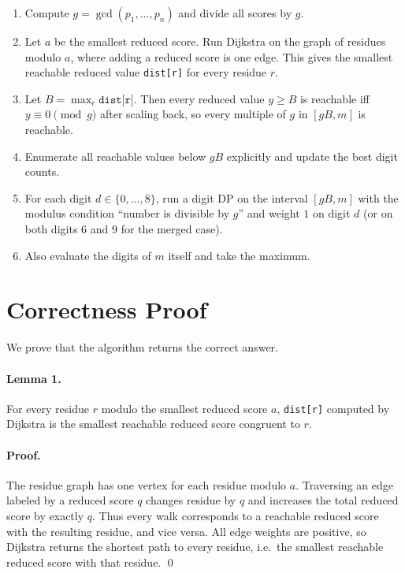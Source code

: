 \documentclass[11pt]{article}
\begin{document}
\begin{enumerate}[leftmargin=*]
    \item Compute $g=\gcd(p_1,\dots,p_n)$ and divide all scores by $g$.
    \item Let $a$ be the smallest reduced score.
    Run Dijkstra on the graph of residues modulo $a$, where adding a reduced score is one edge.
    This gives the smallest reachable reduced value \texttt{dist[r]} for every residue $r$.
    \item Let $B=\max_r \texttt{dist[r]}$.
    Then every reduced value $y \ge B$ is reachable iff $y \equiv 0 \pmod g$ after scaling back, so every
    multiple of $g$ in $[gB,m]$ is reachable.
    \item Enumerate all reachable values below $gB$ explicitly and update the best digit counts.
    \item For each digit $d \in \{0,\dots,8\}$, run a digit DP on the interval $[gB,m]$ with the modulus
    condition ``number is divisible by $g$'' and weight $1$ on digit $d$ (or on both digits $6$ and $9$ for
    the merged case).
    \item Also evaluate the digits of $m$ itself and take the maximum.
\end{enumerate}

\section*{Correctness Proof}

We prove that the algorithm returns the correct answer.

\paragraph{Lemma 1.}
For every residue $r$ modulo the smallest reduced score $a$, \texttt{dist[r]} computed by Dijkstra is the
smallest reachable reduced score congruent to $r$.

\paragraph{Proof.}
The residue graph has one vertex for each residue modulo $a$. Traversing an edge labeled by a reduced
score $q$ changes residue by $q$ and increases the total reduced score by exactly $q$.
Thus every walk corresponds to a reachable reduced score with the resulting residue, and vice versa.
All edge weights are positive, so Dijkstra returns the shortest path to every residue, i.e.\ the smallest
reachable reduced score with that residue. \qed
\end{document}
